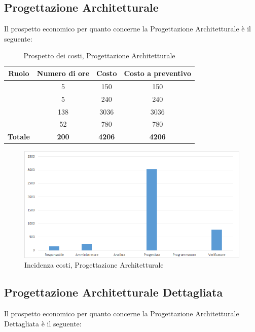 \subsection{Progettazione Architetturale}
Il prospetto economico per quanto concerne la Progettazione Architetturale è il seguente:


\begin{table}[H]
	\begin{center}
		\begin{tabular}{|c|c|c|c|}
			\hline
			\textbf{Ruolo}	& \textbf{Numero di ore} & \textbf{Costo} & \textbf{Costo a preventivo} \\
			\hline
			\Res	&	5  &	150  &	150	\\
			\hline
			\Amm	&	5  &	240  &	240	\\
			\hline
			\Prog	&	138  &	3036  &	3036	\\
			\hline
			\Ver	&	52  &	780  &	780	\\
			\hline
			\textbf{Totale}  &	\textbf{200} &	\textbf{4206} &	\textbf{4206}	\\
			\hline
		\end{tabular}
	\end{center}
	\caption{Prospetto dei costi, Progettazione Architetturale }
\end{table}

\begin{figure}[H]
	\centering
	\includegraphics[scale=0.6]{img/8-2.png}
	\caption{Incidenza costi, Progettazione Architetturale}
\end{figure}

\subsection{Progettazione Architetturale Dettagliata}
Il prospetto economico per quanto concerne la Progettazione Architetturale Dettagliata è il seguente:



